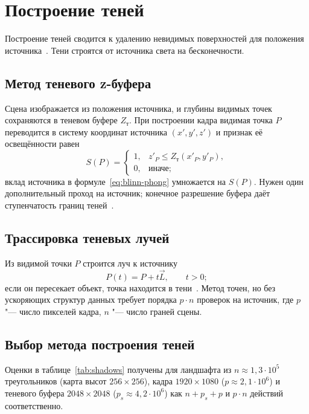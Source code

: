 \section{Построение теней}

Построение теней сводится к удалению невидимых поверхностей для положения источника~\cite[с.~417]{rogers1989}. Тени строятся от источника света на бесконечности.

\subsection{Метод теневого z-буфера}

Сцена изображается из положения источника, и глубины видимых точек сохраняются в теневом буфере $Z_{\text{т}}$. При построении кадра видимая точка $P$ переводится в систему координат источника $(x', y', z')$ и признак её освещённости равен~\cite[с.~422--423]{rogers1989}
\begin{equation}
	S(P) =
	\begin{cases}
		1, & z'_P \leqslant Z_{\text{т}}(x'_P, y'_P), \\
		0, & \text{иначе};
	\end{cases}
	\label{eq:shadow-test}
\end{equation}
вклад источника в формуле~\eqref{eq:blinn-phong} умножается на $S(P)$. Нужен один дополнительный проход на источник; конечное разрешение буфера даёт ступенчатость границ теней~\cite[с.~423]{rogers1989}.

\subsection{Трассировка теневых лучей}

Из видимой точки $P$ строится луч к источнику
\begin{equation}
	P(t) = P + t \vec{L}, \qquad t > 0;
	\label{eq:shadow-ray}
\end{equation}
если он пересекает объект, точка находится в тени~\cite[с.~424--425]{rogers1989}. Метод точен, но без ускоряющих структур данных требует порядка $p \cdot n$ проверок на источник, где $p$ "--- число пикселей кадра, $n$ "--- число граней сцены.

\subsection{Выбор метода построения теней}

Оценки в таблице~\ref{tab:shadows} получены для ландшафта из $n \approx 1{,}3 \cdot 10^5$ треугольников (карта высот $256 \times 256$), кадра $1920 \times 1080$ ($p \approx 2{,}1 \cdot 10^6$) и теневого буфера $2048 \times 2048$ ($p_s \approx 4{,}2 \cdot 10^6$) как $n + p_s + p$ и $p \cdot n$ действий соответственно.

